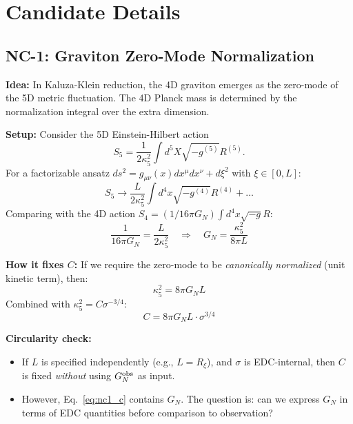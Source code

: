 \documentclass[11pt,a4paper]{article}
\begin{document}
\section{Candidate Details}

\subsection{NC-1: Graviton Zero-Mode Normalization}

\textbf{Idea:} In Kaluza-Klein reduction, the 4D graviton emerges as the
zero-mode of the 5D metric fluctuation. The 4D Planck mass is determined by
the normalization integral over the extra dimension.

\textbf{Setup:} Consider the 5D Einstein-Hilbert action
\[
S_5 = \frac{1}{2\kappa_5^2} \int d^5X \sqrt{-g^{(5)}} R^{(5)}.
\]
For a factorizable ansatz $ds^2 = g_{\mu\nu}(x) dx^\mu dx^\nu + d\xi^2$
with $\xi \in [0, L]$:
\[
S_5 \to \frac{L}{2\kappa_5^2} \int d^4x \sqrt{-g^{(4)}} R^{(4)} + \ldots
\]
Comparing with the 4D action $S_4 = (1/16\pi G_N) \int d^4x \sqrt{-g} R$:
\begin{equation}
\frac{1}{16\pi G_N} = \frac{L}{2\kappa_5^2}
\quad \Rightarrow \quad
G_N = \frac{\kappa_5^2}{8\pi L}
\label{eq:nc1_gn}
\end{equation}

\textbf{How it fixes $C$:} If we require the zero-mode to be \textit{canonically
normalized} (unit kinetic term), then:
\begin{equation}
\kappa_5^2 = 8\pi G_N L
\label{eq:nc1_kappa}
\end{equation}
Combined with $\kappa_5^2 = C \sigma^{-3/4}$:
\begin{equation}
C = 8\pi G_N L \cdot \sigma^{3/4}
\label{eq:nc1_c}
\end{equation}

\textbf{Circularity check:}
\begin{itemize}
\item If $L$ is specified independently (e.g., $L = R_\xi$), and $\sigma$ is
EDC-internal, then $C$ is fixed \textit{without} using $G_N^{\rm obs}$ as input.
\item However, Eq.~\eqref{eq:nc1_c} contains $G_N$. The question is: can we
express $G_N$ in terms of EDC quantities before comparison to observation?
\end{itemize}
\end{document}
